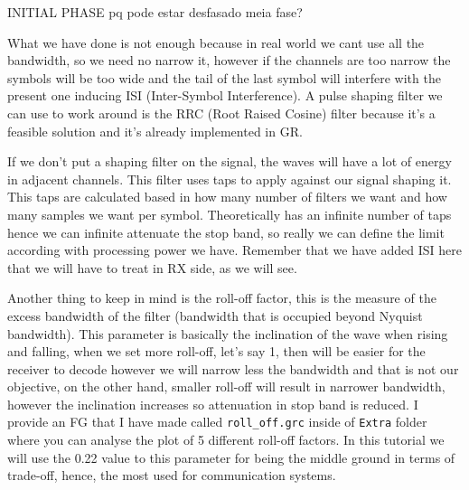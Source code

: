 \documentclass[a4paper, 10pt, conference]{ieeeconf}      %
\begin{document}
    INITIAL PHASE pq pode estar desfasado meia fase? 
    
    
    
    


    What we have done is not enough because in real world we cant use all the bandwidth, so we need no narrow it, however if the channels are too narrow the symbols will be too wide and the tail of the last symbol will interfere with the present one inducing ISI (Inter-Symbol Interference). A pulse shaping filter we can use to work around is the RRC (Root Raised Cosine) filter because it's a feasible solution and it's already implemented in GR.      
    
   If we don't put a shaping filter on the signal, the waves will have a lot of energy in adjacent channels. This filter uses taps to apply against our signal shaping it. This taps are calculated based in how many number of filters we want and how many samples we want per symbol. Theoretically has an infinite number of taps hence we can infinite attenuate the stop band, so really we can define the limit according with processing power we have. Remember that we have added ISI here that we will have to treat in RX side, as we will see. 
   

    Another thing to keep in mind is the roll-off factor, this is the measure of the excess bandwidth of the filter (bandwidth that is occupied beyond Nyquist bandwidth). This parameter is basically the inclination of the wave when rising and falling, when we set more roll-off, let's say 1, then will be easier for the receiver to decode however we will narrow less the bandwidth and that is not our objective, on the other hand, smaller roll-off will result in narrower bandwidth, however the inclination increases so attenuation in stop band is reduced.
    I provide an FG that I have made called \verb|roll_off.grc| inside of \verb|Extra| folder where you can analyse the plot of 5 different roll-off factors. In this tutorial we will use the 0.22 value to this parameter for being the middle ground in terms of trade-off, hence, the most used for communication systems.
    
\end{document}
